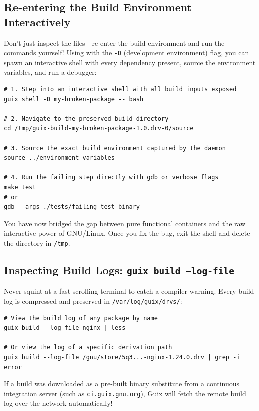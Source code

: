 \subsection{Re-entering the Build Environment Interactively}

Don't just inspect the files---re-enter the build environment and run the commands yourself! Using  with the \texttt{-D} (development environment) flag, you can spawn an interactive shell with every dependency present, source the environment variables, and run a debugger:

\begin{lstlisting}[style=guixcli]
# 1. Step into an interactive shell with all build inputs exposed
guix shell -D my-broken-package -- bash

# 2. Navigate to the preserved build directory
cd /tmp/guix-build-my-broken-package-1.0.drv-0/source

# 3. Source the exact build environment captured by the daemon
source ../environment-variables

# 4. Run the failing step directly with gdb or verbose flags
make test
# or
gdb --args ./tests/failing-test-binary
\end{lstlisting}

You have now bridged the gap between pure functional containers and the raw interactive power of GNU/Linux. Once you fix the bug, exit the shell and delete the directory in \texttt{/tmp}.

\subsection{Inspecting Build Logs: \texttt{guix build --log-file}}

Never squint at a fast-scrolling terminal to catch a compiler warning. Every build log is compressed and preserved in \texttt{/var/log/guix/drvs/}:

\begin{lstlisting}[style=guixcli]
# View the build log of any package by name
guix build --log-file nginx | less

# Or view the log of a specific derivation path
guix build --log-file /gnu/store/5q3...-nginx-1.24.0.drv | grep -i error
\end{lstlisting}

If a build was downloaded as a pre-built binary substitute from a continuous integration server (such as \texttt{ci.guix.gnu.org}), Guix will fetch the remote build log over the network automatically!

